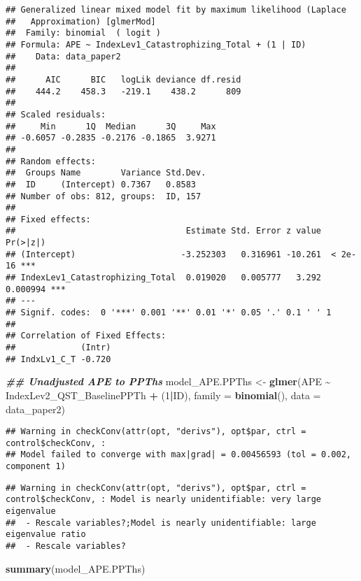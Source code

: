 \documentclass[
  12pt,
]{article}
\newenvironment{Shaded}{\begin{snugshade}}{\end{snugshade}}
\newcommand{\AttributeTok}[1]{\textcolor[rgb]{0.13,0.29,0.53}{#1}}
\newcommand{\DecValTok}[1]{\textcolor[rgb]{0.00,0.00,0.81}{#1}}
\newcommand{\DocumentationTok}[1]{\textcolor[rgb]{0.56,0.35,0.01}{\textbf{\textit{#1}}}}
\newcommand{\FunctionTok}[1]{\textcolor[rgb]{0.13,0.29,0.53}{\textbf{#1}}}
\newcommand{\NormalTok}[1]{#1}
\newcommand{\OtherTok}[1]{\textcolor[rgb]{0.56,0.35,0.01}{#1}}
\newcommand{\SpecialCharTok}[1]{\textcolor[rgb]{0.81,0.36,0.00}{\textbf{#1}}}
\begin{document}
\begin{verbatim}
## Generalized linear mixed model fit by maximum likelihood (Laplace
##   Approximation) [glmerMod]
##  Family: binomial  ( logit )
## Formula: APE ~ IndexLev1_Catastrophizing_Total + (1 | ID)
##    Data: data_paper2
## 
##      AIC      BIC   logLik deviance df.resid 
##    444.2    458.3   -219.1    438.2      809 
## 
## Scaled residuals: 
##     Min      1Q  Median      3Q     Max 
## -0.6057 -0.2835 -0.2176 -0.1865  3.9271 
## 
## Random effects:
##  Groups Name        Variance Std.Dev.
##  ID     (Intercept) 0.7367   0.8583  
## Number of obs: 812, groups:  ID, 157
## 
## Fixed effects:
##                                  Estimate Std. Error z value Pr(>|z|)    
## (Intercept)                     -3.252303   0.316961 -10.261  < 2e-16 ***
## IndexLev1_Catastrophizing_Total  0.019020   0.005777   3.292 0.000994 ***
## ---
## Signif. codes:  0 '***' 0.001 '**' 0.01 '*' 0.05 '.' 0.1 ' ' 1
## 
## Correlation of Fixed Effects:
##             (Intr)
## IndxLv1_C_T -0.720
\end{verbatim}

\begin{Shaded}
\begin{Highlighting}[]
\DocumentationTok{\#\# Unadjusted APE to PPThs}
\NormalTok{model\_APE.PPThs }\OtherTok{\textless{}{-}} \FunctionTok{glmer}\NormalTok{(APE }\SpecialCharTok{\textasciitilde{}}\NormalTok{ IndexLev2\_QST\_BaselinePPTh }\SpecialCharTok{+}\NormalTok{ (}\DecValTok{1}\SpecialCharTok{|}\NormalTok{ID), }\AttributeTok{family =} \FunctionTok{binomial}\NormalTok{(), }\AttributeTok{data =}\NormalTok{ data\_paper2)}
\end{Highlighting}
\end{Shaded}

\begin{verbatim}
## Warning in checkConv(attr(opt, "derivs"), opt$par, ctrl = control$checkConv, :
## Model failed to converge with max|grad| = 0.00456593 (tol = 0.002, component 1)
\end{verbatim}

\begin{verbatim}
## Warning in checkConv(attr(opt, "derivs"), opt$par, ctrl = control$checkConv, : Model is nearly unidentifiable: very large eigenvalue
##  - Rescale variables?;Model is nearly unidentifiable: large eigenvalue ratio
##  - Rescale variables?
\end{verbatim}

\begin{Shaded}
\begin{Highlighting}[]
\FunctionTok{summary}\NormalTok{(model\_APE.PPThs)}
\end{Highlighting}
\end{Shaded}
\end{document}
